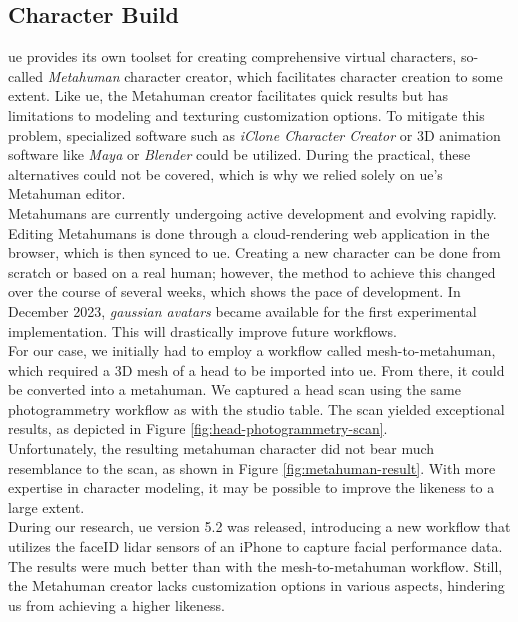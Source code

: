 \documentclass[
  a4paper,  %
  twoside,  %
  bibliography=totoc,
  headsepline,
  cleardoublepage=empty,
  parskip=half,
  draft=false
]{scrbook}
\begin{document}
\subsection*{Character Build}
\gls{ue} provides its own toolset for creating comprehensive virtual characters, so-called \textit{Metahuman} character creator, which facilitates character creation to some extent. Like \gls{ue}, the Metahuman creator facilitates quick results but has limitations to modeling and texturing customization options. To mitigate this problem, specialized software such as \textit{iClone Character Creator} or 3D animation software like \textit{Maya} or \textit{Blender} could be utilized. During the practical, these alternatives could not be covered, which is why we relied solely on \gls{ue}'s Metahuman editor. \\
Metahumans are currently undergoing active development and evolving rapidly. Editing Metahumans is done through a cloud-rendering web application in the browser, which is then synced to \gls{ue}. Creating a new character can be done from scratch or based on a real human; however, the method to achieve this changed over the course of several weeks, which shows the pace of development. In December 2023, \textit{gaussian avatars} became available for the first experimental implementation. This will drastically improve future workflows. \\
For our case, we initially had to employ a workflow called mesh-to-metahuman, which required a 3D mesh of a head to be imported into \gls{ue}. From there, it could be converted into a metahuman. We captured a head scan using the same photogrammetry workflow as with the studio table. The scan yielded exceptional results, as depicted in Figure \ref{fig:head-photogrammetry-scan}. \\
Unfortunately, the resulting metahuman character did not bear much resemblance to the scan, as shown in Figure \ref{fig:metahuman-result}. With more expertise in character modeling, it may be possible to improve the likeness to a large extent. \\
During our research, \gls{ue} version 5.2 was released, introducing a new workflow that utilizes the faceID lidar sensors of an iPhone to capture facial performance data. The results were much better than with the mesh-to-metahuman workflow. Still, the Metahuman creator lacks customization options in various aspects, hindering us from achieving a higher likeness.
\end{document}
